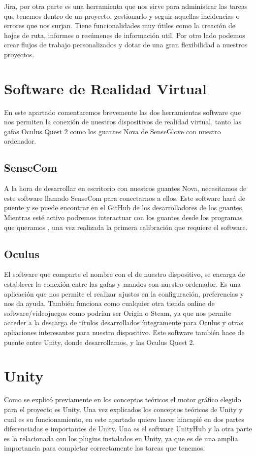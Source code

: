 Jira, por otra parte es una herramienta que nos sirve para administrar las tareas que tenemos dentro de un proyecto, gestionarlo y seguir aquellas incidencias o errores que nos surjan. Tiene funcionalidades muy útiles como la creación de hojas de ruta, informes o resúmenes de información util. Por otro lado podemos crear flujos de trabajo personalizados y dotar de una gran flexibilidad a nuestros proyectos.

\section{Software de Realidad Virtual}
En este apartado comentaremos brevemente las dos herramientas software que nos permiten la conexión de nuestros dispositivos de realidad virtual, tanto las gafas Oculus Quest 2\cite{Quest2} como los guantes Nova\cite{SGloveNova} de SenseGlove con nuestro ordenador.
\subsection{SenseCom}
A la hora de desarrollar en escritorio con nuestros guantes Nova, necesitamos de este software llamado SenseCom para conectarnos a ellos. Este software hará de puente y se puede encontrar en el GitHub de los desarrolladores de los guantes. 
Mientras esté activo podremos interactuar con los guantes desde los programas que queramos , una vez realizada la primera calibración que requiere el software.
\subsection{Oculus}
El software que comparte el nombre con el de nuestro dispositivo, se encarga de establecer la conexión entre las gafas y mandos con nuestro ordenador. Es una aplicación que nos permite el realizar ajustes en la configuración, preferencias y nos da ayuda. También funciona como cualquier otra tienda online de software/videojuegos como podrían ser Origin o Steam, ya que nos permite acceder a la descarga de títulos desarrollados íntegramente para Oculus y otras apliaciones interesantes para nuestro dispositivo. Este software también hace de puente entre Unity\cite{Unity}, donde desarrollamos, y las Oculus Quest 2. 
\section{Unity}
Como se explicó previamente en los conceptos teóricos el motor gráfico elegido para el proyecto es Unity\cite{Unity}. Una vez explicados los conceptos teóricos de Unity y cual es su funcionamiento, en este apartado quiero hacer hincapié en dos partes diferenciadas e importantes de Unity. Una es el software UnityHub y la otra parte es la relacionada con los plugins instalados en Unity, ya que es de una amplia importancia para completar correctamente las tareas que tenemos. 

